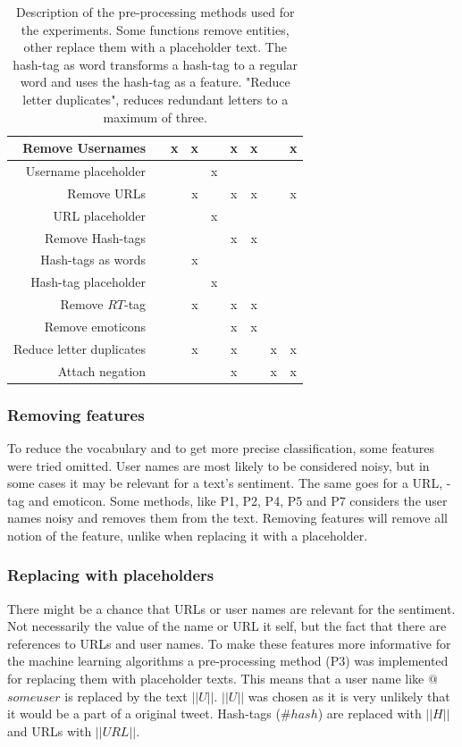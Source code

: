 \begin{table}[!htb]
\begin{tabular}{|r||c|c|c|c|c|c|c|c|}
	 
		Remove Usernames                     & & x & x &   & x & x & & x \\ \hline
		Username placeholder       & &   &   & x &   &   & & \\ \hline
		Remove URLs                          & &   & x &   & x & x & & x \\ \hline
		URL placeholder        & &   &   & x &   &   & & \\ \hline
		Remove Hash-tags                     & &   &   &   & x & x & & \\ \hline
		Hash-tags as words                   & &   & x &   &   &   & & \\ \hline
		Hash-tag placeholder          & &   &   & x &   &   & & \\ \hline
		Remove $RT$-tag                      & &   & x &   & x & x & & \\ \hline
		Remove emoticons                     & &   &   &   & x & x & & \\ \hline
		Reduce letter duplicates             & &   & x &   & x &   & x & x \\ \hline
		Attach negation  & &   &   &   & x &   & x & x \\ \hline
	\end{tabular}
	\caption[Description of used pre-processing methods]{Description of the pre-processing methods used for the experiments. Some functions remove entities, other replace them with a placeholder text. The hash-tag as word transforms a hash-tag to a regular word and uses the hash-tag as a feature. "Reduce letter duplicates", reduces redundant letters to a maximum of three.}
	\label{tab:preproc_desc}
\end{table}

\subsubsection{Removing features}
To reduce the vocabulary and to get more precise classification, some features were tried omitted. User names are most likely to be considered noisy, but in some cases it may be relevant for a text's sentiment. The same goes for a URL, -tag and emoticon. Some methods, like P1, P2, P4, P5 and P7 considers the user names noisy and removes them from the text. Removing features will remove all notion of the feature, unlike when replacing it with a placeholder.

\subsubsection{Replacing with placeholders}
There might be a chance that URLs or user names are relevant for the sentiment. Not necessarily the value of the name or URL it self, but the fact that there are references to URLs and user names. To make these features more informative for the machine learning algorithms a pre-processing method (P3) was implemented for replacing them with placeholder texts. This means that a user name like $@$$someuser$ is replaced by the text $||U||$. $||U||$ was chosen as it is very unlikely that it would be a part of a original tweet. Hash-tags ($\#hash$) are replaced with $||H||$ and URLs with $||URL||$. 

